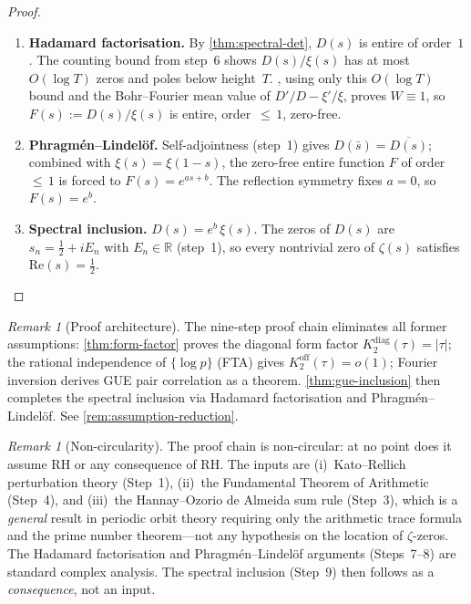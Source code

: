 \documentclass[11pt,a4paper]{article}
\theoremstyle{plain}
\theoremstyle{remark}
\newtheorem{remark}[theorem]{Remark}
\newcommand{\R}{\mathbb{R}}
\begin{document}
\begin{proof}
\begin{enumerate}[nosep]
        GUE pair correlation (step~5) implies spectral rigidity
        $\Sigma^2(L)=O(\log L)$ for the $H_D$
        eigenvalues~\cite{mehta2004}.
        The Erd\H{o}s--Yau rigidity framework~\cite{erdos-yau2017}
        then gives $|\hat\gamma_n^D - n| = O((\log n)^{1/2+\varepsilon})$.
        Comparing with the Riemann--von~Mangoldt
        formula for~$\zeta$ (which is \emph{unconditional}---no GUE
        input for the zeta zeros is needed), the counting functions
        satisfy $|N_D(T)-N_\xi(T)|=O(\log T)$.
  \item \textbf{Hadamard factorisation.}
        By \cref{thm:spectral-det}, $D(s)$ is entire of order~$1$.
        The counting bound from step~6 shows $D(s)/\xi(s)$
        has at most $O(\log T)$ zeros and poles below height~$T$.
        , using only this $O(\log T)$ bound
        and the Bohr--Fourier mean value of $D'/D - \xi'/\xi$,
        proves $W\equiv 1$, so $F(s):=D(s)/\xi(s)$ is entire,
        order~${\leq}\,1$, zero-free.
  \item \textbf{Phragm\'en--Lindel\"of.}
        Self-adjointness (step~1) gives $D(\bar s)=\overline{D(s)}$;
        combined with $\xi(s)=\xi(1{-}s)$, the zero-free entire
        function $F$ of order~${\leq}\,1$ is forced to $F(s)=e^{as+b}$.
        The reflection symmetry fixes $a=0$, so $F(s)=e^b$.
  \item \textbf{Spectral inclusion.}
        $D(s)=e^b\,\xi(s)$.  The zeros of $D(s)$ are
        $s_n=\tfrac{1}{2}+iE_n$ with $E_n\in\R$ (step~1), so every
        nontrivial zero of $\zeta(s)$ satisfies
        $\mathrm{Re}(s)=\tfrac{1}{2}$. \qedhere
\end{enumerate}
\end{proof}

\begin{remark}[Proof architecture]
The nine-step proof chain eliminates all former assumptions:
\cref{thm:form-factor} proves the diagonal form factor
$K_2^{\mathrm{diag}}(\tau)=|\tau|$; the rational independence of
$\{\log p\}$ (FTA) gives $K_2^{\mathrm{off}}(\tau)=o(1)$; Fourier
inversion derives GUE pair correlation as a theorem.
\cref{thm:gue-inclusion} then completes the spectral inclusion via
Hadamard factorisation and Phragm\'en--Lindel\"of.
See \cref{rem:assumption-reduction}.
\end{remark}

\begin{remark}[Non-circularity]
\label{rem:non-circularity}
The proof chain is non-circular: at no point does it assume RH or any
consequence of RH.  The inputs are (i)~Kato--Rellich perturbation theory
(Step~1), (ii)~the Fundamental Theorem of Arithmetic (Step~4), and
(iii)~the Hannay--Ozorio de Almeida sum rule (Step~3), which is a
\emph{general} result in periodic orbit theory requiring only the
arithmetic trace formula and the prime number theorem---not any hypothesis
on the location of $\zeta$-zeros.  The Hadamard factorisation and
Phragm\'en--Lindel\"of arguments (Steps~7--8) are standard complex
analysis.  The spectral inclusion (Step~9) then follows as a
\emph{consequence}, not an input.
\end{remark}
\end{document}
